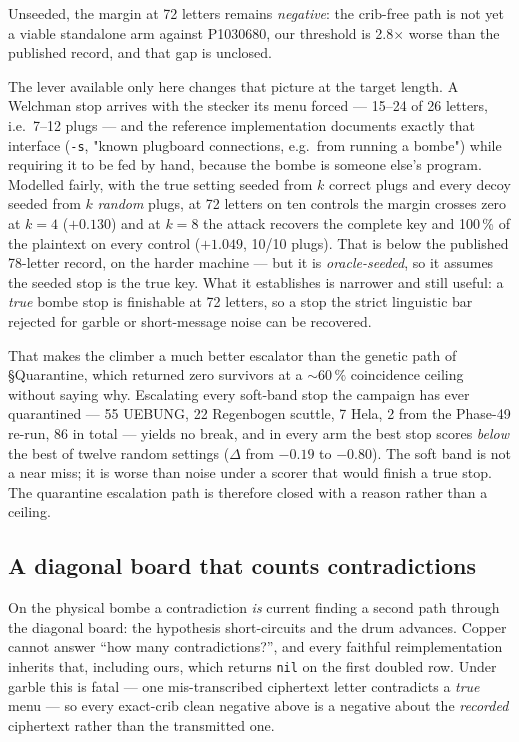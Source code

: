 \documentclass[11pt,a4paper]{article}
\begin{document}
Unseeded, the margin at 72 letters remains \emph{negative}: the crib-free path is
not yet a viable standalone arm against P1030680, our threshold is 2.8$\times$
worse than the published record, and that gap is unclosed.

The lever available only here changes that picture at the target length.
A Welchman stop arrives with the stecker its menu forced --- 15--24 of 26 letters,
i.e.\ 7--12 plugs --- and the reference implementation documents exactly that
interface (\texttt{-s}, "known plugboard connections, e.g.\ from running a bombe")
while requiring it to be fed by hand, because the bombe is someone else's program.
Modelled fairly, with the true setting seeded from $k$ correct plugs and every
decoy seeded from $k$ \emph{random} plugs, at 72 letters on ten controls the margin
crosses zero at $k=4$ ($+0.130$) and at $k=8$ the attack recovers the complete key
and 100\,\% of the plaintext on every control ($+1.049$, 10/10 plugs).
That is below the published 78-letter record, on the harder machine --- but it is
\emph{oracle-seeded}, so it assumes the seeded stop is the true key.
What it establishes is narrower and still useful: a \emph{true} bombe stop is
finishable at 72 letters, so a stop the strict linguistic bar rejected for garble or
short-message noise can be recovered.

That makes the climber a much better escalator than the genetic path of §Quarantine,
which returned zero survivors at a ${\sim}60\,\%$ coincidence ceiling without saying
why.
Escalating every soft-band stop the campaign has ever quarantined --- 55 UEBUNG, 22
Regenbogen scuttle, 7 Hela, 2 from the Phase-49 re-run, 86 in total --- yields no
break, and in every arm the best stop scores \emph{below} the best of twelve random
settings ($\Delta$ from $-0.19$ to $-0.80$).
The soft band is not a near miss; it is worse than noise under a scorer that would
finish a true stop.
The quarantine escalation path is therefore closed with a reason rather than a
ceiling.

\subsection{A diagonal board that counts contradictions}

On the physical bombe a contradiction \emph{is} current finding a second path through
the diagonal board: the hypothesis short-circuits and the drum advances.
Copper cannot answer ``how many contradictions?'', and every faithful
reimplementation inherits that, including ours, which returns \texttt{nil} on the
first doubled row.
Under garble this is fatal --- one mis-transcribed ciphertext letter contradicts a
\emph{true} menu --- so every exact-crib clean negative above is a negative about the
\emph{recorded} ciphertext rather than the transmitted one.
\end{document}
